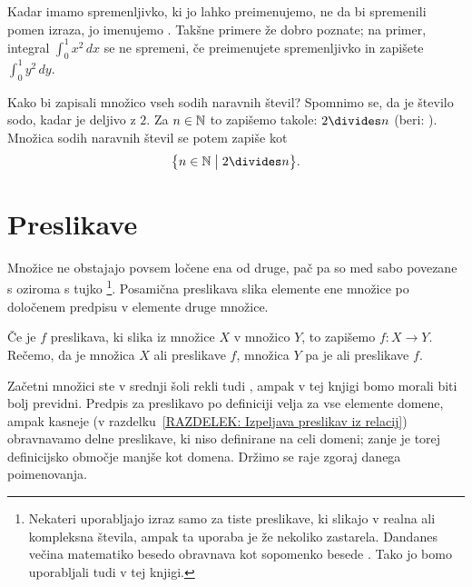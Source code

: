                 Kadar imamo spremenljivko, ki jo lahko preimenujemo, ne da bi spremenili pomen izraza, jo imenujemo . Takšne primere že dobro poznate; na primer, integral $\int_0^1 x^2 \,dx$ se ne spremeni, če preimenujete spremenljivko in zapišete $\int_0^1 y^2 \,dy$.

                \begin{zgled}
                        Kako bi zapisali množico vseh sodih naravnih števil? Spomnimo se, da je število sodo, kadar je deljivo z $2$. Za $n \in \mathbb{N}$ to zapišemo takole: $2 \divides n$ (beri: ). Množica sodih naravnih števil se potem zapiše kot
                        \[\set[1]{n \in \NN}{2 \divides n}.\]
                \end{zgled}


        \section{Preslikave}

                Množice ne obstajajo povsem ločene ena od druge, pač pa so med sabo povezane s  oziroma s tujko \footnote{Nekateri uporabljajo izraz  samo za tiste preslikave, ki slikajo v realna ali kompleksna števila, ampak ta uporaba je že nekoliko zastarela. Dandanes večina matematiko besedo  obravnava kot sopomenko besede . Tako jo bomo uporabljali tudi v tej knjigi.}. Posamična preslikava slika elemente ene množice po določenem predpisu v elemente druge množice.

                Če je $f$ preslikava, ki slika iz množice $X$ v množico $Y$, to zapišemo $f\colon X \to Y$. Rečemo, da je množica $X$  ali  preslikave $f$, množica $Y$ pa je  ali  preslikave $f$.

                Začetni množici ste v srednji šoli rekli tudi , ampak v tej knjigi bomo morali biti bolj previdni. Predpis za preslikavo po definiciji velja za vse elemente domene, ampak kasneje (v razdelku~\ref{RAZDELEK: Izpeljava preslikav iz relacij}) obravnavamo delne preslikave, ki niso definirane na celi domeni; zanje je torej definicijsko območje manjše kot domena. Držimo se raje zgoraj danega poimenovanja.

